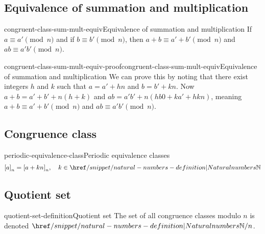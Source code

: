 \documentclass[preview]{standalone}
\begin{document}
\subsection{Equivalence of summation and multiplication}

\begin{snippetproposition}{congruent-class-sum-mult-equiv}{Equivalence of summation and multiplication}
    If \(a \equiv a' \pmod{n}\) and if \(b \equiv b' \pmod{n}\), then
    \(a+b \equiv a' + b' \pmod{n}\) and \(ab \equiv a'b' \pmod{n}\).
\end{snippetproposition}

\begin{snippetproof}{congruent-class-sum-mult-equiv-proof}{congruent-class-sum-mult-equiv}{Equivalence of summation and multiplication}
    We can prove this by noting that there exist integers \(h\) and \(k\) such that
    \(a=a'+hn\) and \(b=b'+kn\).
    Now \(a+b = a'+b'+n(h+k)\) and \(ab=a'b' + n(hb0+ka'+hkn)\), meaning
    \(a+b \equiv a' + b' \pmod{n}\) and \(ab \equiv a'b' \pmod{n}\).
\end{snippetproof}

\subsection{Congruence class}


\begin{snippetproposition}{periodic-equivalence-class}{Periodic equivalence classes}
    \[
        {[a]}_n = {[a + kn]}_n,\quad k \in \naturalnumbers
    \]
\end{snippetproposition}

\subsection{Quotient set}

\begin{snippetdefinition}{quotient-set-definition}{Quotient set}
    The set of all congruence classes modulo \(n\) is denoted \(\naturalnumbers / n\).
\end{snippetdefinition}
\end{document}
